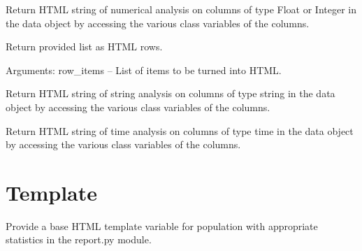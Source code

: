 \documentclass[letterpaper,10pt,english]{sphinxmanual}
\begin{document}
\begin{fulllineitems}
\begin{fulllineitems}
\end{fulllineitems}


\begin{fulllineitems}
\label{Code_rst/rep:report.Report.numerical_analysis}
Return HTML string of numerical analysis on columns of type Float or 
Integer in the data object by accessing the various class variables of the
columns.

\end{fulllineitems}


\begin{fulllineitems}
\label{Code_rst/rep:report.Report.row_creator}
Return provided list as HTML rows.

Arguments:
row\_items -- List of items to be turned into HTML.

\end{fulllineitems}


\begin{fulllineitems}
\label{Code_rst/rep:report.Report.string_analysis}
Return HTML string of string analysis on columns of type string 
in the data object by accessing the various class variables of the
columns.

\end{fulllineitems}


\begin{fulllineitems}
\label{Code_rst/rep:report.Report.time_analysis}
Return HTML string of time analysis on columns of type time 
in the data object by accessing the various class variables of the
columns.

\end{fulllineitems}


\end{fulllineitems}



\section{Template}
\label{Code_rst/templ:module-template}\label{Code_rst/templ:template}\label{Code_rst/templ::doc}
Provide a base HTML template variable for population with appropriate
statistics in the report.py module.
\end{document}
